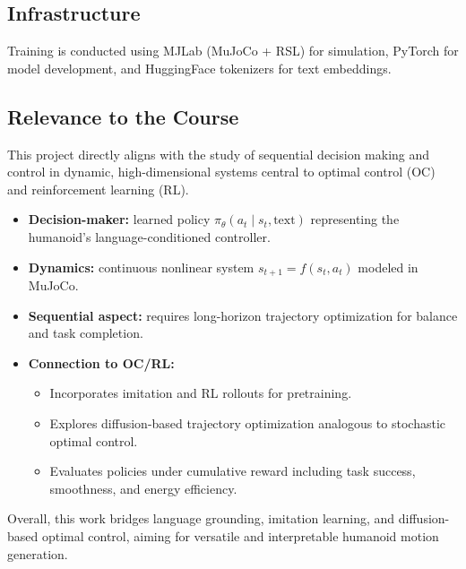 \subsection{Infrastructure}
Training is conducted using MJLab (MuJoCo + RSL) for simulation, PyTorch for model development, and HuggingFace tokenizers for text embeddings.

\subsection{Relevance to the Course}

This project directly aligns with the study of sequential decision making and control in dynamic, high-dimensional systems central to optimal control (OC) and reinforcement learning (RL).

\begin{itemize}
    \item \textbf{Decision-maker:} learned policy $\pi_\theta(a_t \mid s_t, \text{text})$ representing the humanoid’s language-conditioned controller.
    \item \textbf{Dynamics:} continuous nonlinear system $s_{t+1} = f(s_t, a_t)$ modeled in MuJoCo.
    \item \textbf{Sequential aspect:} requires long-horizon trajectory optimization for balance and task completion.
    \item \textbf{Connection to OC/RL:}
    \begin{itemize}
        \item Incorporates imitation and RL rollouts for pretraining.
        \item Explores diffusion-based trajectory optimization analogous to stochastic optimal control.
        \item Evaluates policies under cumulative reward including task success, smoothness, and energy efficiency.
    \end{itemize}
\end{itemize}

Overall, this work bridges language grounding, imitation learning, and diffusion-based optimal control, aiming for versatile and interpretable humanoid motion generation.